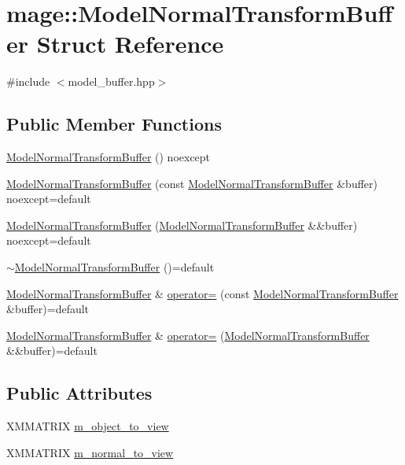 \hypertarget{structmage_1_1_model_normal_transform_buffer}{}\section{mage\+:\+:Model\+Normal\+Transform\+Buffer Struct Reference}
\label{structmage_1_1_model_normal_transform_buffer}


{\ttfamily \#include $<$model\+\_\+buffer.\+hpp$>$}

\subsection*{Public Member Functions}
\begin{DoxyCompactItemize}
\item 
\hyperlink{structmage_1_1_model_normal_transform_buffer_a04ff9f7d8da77cc7089fa1cd1ae2e2ff}{Model\+Normal\+Transform\+Buffer} () noexcept
\item 
\hyperlink{structmage_1_1_model_normal_transform_buffer_a3e8cbbf4816f6b60f7ed346e7bbed752}{Model\+Normal\+Transform\+Buffer} (const \hyperlink{structmage_1_1_model_normal_transform_buffer}{Model\+Normal\+Transform\+Buffer} \&buffer) noexcept=default
\item 
\hyperlink{structmage_1_1_model_normal_transform_buffer_a8af074b84d44bc22d047420f241dc85e}{Model\+Normal\+Transform\+Buffer} (\hyperlink{structmage_1_1_model_normal_transform_buffer}{Model\+Normal\+Transform\+Buffer} \&\&buffer) noexcept=default
\item 
\hyperlink{structmage_1_1_model_normal_transform_buffer_a157d1f7cc47463f6b589d25c039ec418}{$\sim$\+Model\+Normal\+Transform\+Buffer} ()=default
\item 
\hyperlink{structmage_1_1_model_normal_transform_buffer}{Model\+Normal\+Transform\+Buffer} \& \hyperlink{structmage_1_1_model_normal_transform_buffer_ae0b033dc93145a55e5e00024f8f95330}{operator=} (const \hyperlink{structmage_1_1_model_normal_transform_buffer}{Model\+Normal\+Transform\+Buffer} \&buffer)=default
\item 
\hyperlink{structmage_1_1_model_normal_transform_buffer}{Model\+Normal\+Transform\+Buffer} \& \hyperlink{structmage_1_1_model_normal_transform_buffer_acc27af2e1e65994a43e1d804aa25bb5a}{operator=} (\hyperlink{structmage_1_1_model_normal_transform_buffer}{Model\+Normal\+Transform\+Buffer} \&\&buffer)=default
\end{DoxyCompactItemize}
\subsection*{Public Attributes}
\begin{DoxyCompactItemize}
\item 
X\+M\+M\+A\+T\+R\+IX \hyperlink{structmage_1_1_model_normal_transform_buffer_afd0823b56d399f56245a5e652b25e6d5}{m\+\_\+object\+\_\+to\+\_\+view}
\item 
X\+M\+M\+A\+T\+R\+IX \hyperlink{structmage_1_1_model_normal_transform_buffer_a1d79f8570b8bc020406e007f30bcfb13}{m\+\_\+normal\+\_\+to\+\_\+view}
\end{DoxyCompactItemize}


